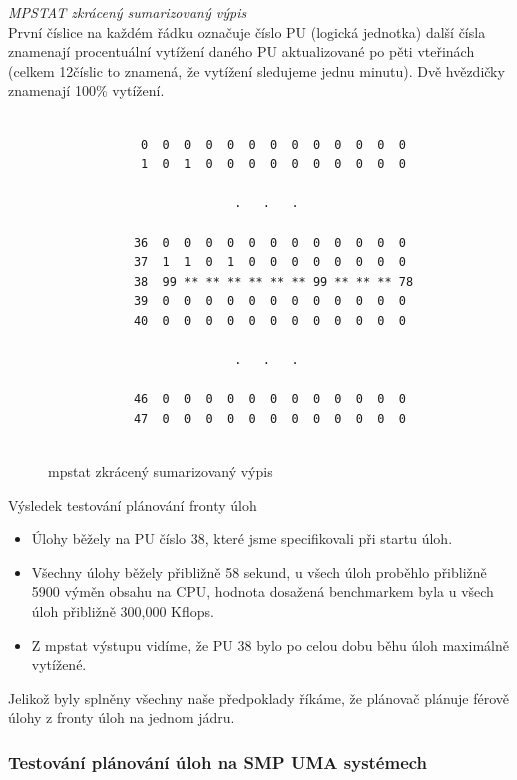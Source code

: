 \documentclass[a4paper,12pt]{article}
\begin{document}
\noindent
\textit{MPSTAT zkrácený sumarizovaný výpis} \\ 

První číslice na každém řádku označuje číslo PU (logická jednotka) další čísla znamenají procentuální vytížení daného PU aktualizované po pěti vteřinách (celkem 12číslic to znamená, že vytížení sledujeme jednu minutu). Dvě hvězdičky znamenají 100\% vytížení. 

\begin{figure}[ht]
\caption{mpstat zkrácený sumarizovaný výpis}
\center
\label{mpstat1}

\begin{Verbatim}[frame=single]

             0  0  0  0  0  0  0  0  0  0  0  0  0
             1  0  1  0  0  0  0  0  0  0  0  0  0
            
                          .   .   .
           
            36  0  0  0  0  0  0  0  0  0  0  0  0
            37  1  1  0  1  0  0  0  0  0  0  0  0
            38  99 ** ** ** ** ** ** 99 ** ** ** 78
            39  0  0  0  0  0  0  0  0  0  0  0  0
            40  0  0  0  0  0  0  0  0  0  0  0  0
           
                          .   .   .
           
            46  0  0  0  0  0  0  0  0  0  0  0  0
            47  0  0  0  0  0  0  0  0  0  0  0  0
           
\end{Verbatim}
\end{figure}

\noindent
Výsledek testování plánování fronty úloh
\begin{itemize}
\item Úlohy běžely na PU číslo 38, které jsme specifikovali při startu úloh.
\item Všechny úlohy běžely přibližně 58 sekund, u všech úloh proběhlo přibližně 5900 výměn obsahu na CPU, hodnota dosažená benchmarkem byla u všech úloh přibližně 300,000 Kflops.
\item Z mpstat výstupu vidíme, že PU 38 bylo po celou dobu běhu úloh maximálně vytížené.
\end{itemize}

Jelikož byly splněny všechny naše předpoklady říkáme, že plánovač plánuje férově úlohy z fronty úloh na jednom jádru.

\subsubsection{Testování plánování úloh na SMP UMA systémech}
\end{document}

